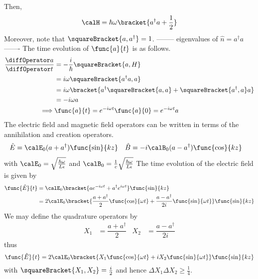 Then, 
\begin{equation*}
    \calH = \hbar \omega \bracket{a^{\dagger} a + \dfrac{1}{2}}
\end{equation*}
Moreover, note that \(\squareBracket{a,a^{\dagger}} = 1\). -------- eigenvalues of \(\hat{n} = a^{\dagger} a\) -------
The time evolution of \(\func{a}{t}\) is as follows.
\begin{align*}
    \dfrac{\diffOperator a}{\diffOperator t} &= -\frac{i}{\hbar} \squareBracket{a,H}\\
    &= i\omega \squareBracket{a^{\dagger}a , a}\\
    &= i\omega \bracket{a^{\dagger} \squareBracket{a,a} + \squareBracket{a^{\dagger},a}a}\\
    &= -i\omega a \\
    \implies& \func{a}{t} = e^{-i\omega t} \func{a}{0} = e^{-i\omega t} a
\end{align*}
The electric field and magnetic field operators can be written in terms of the annihilation and creation operators.  
\begin{align*}
    \hat{E} &= \calE_0 (a + a^{\dagger}) \func{\sin}{kz} &
    \hat{B} &= -i\calB_0 (a - a^{\dagger}) \func{\cos}{kz}
\end{align*}
with \(\calE_0 = \sqrt{\frac{\hbar\omega}{L \epsilon}}\) and \(\calB_0 = \frac{1}{c} \sqrt{\frac{\hbar \omega}{L \epsilon}} \)
The time evolution of the electric field is given by 
\begin{align*}
    \func{\hat{E}}{t} &= \calE_0 \bracket{a e^{-i\omega t} + a^{\dagger} e^{i\omega t}}\func{\sin}{kz}\\
    &= 2\calE_0 \bracket{\dfrac{a + a^{\dagger}}{2} \func{\cos}{\omega t}  + \dfrac{a - a^{\dagger}}{2i} \func{\sin}{\omega t}}\func{\sin}{kz}
\end{align*}
We may define the quadrature operators by 
\begin{align*}
    X_1 &= \dfrac{a + a^{\dagger}}{2}  & X_2 &= \dfrac{a - a^{\dagger}}{2i} 
\end{align*}
thus 
\begin{equation*}
    \func{\hat{E}}{t}= 2\calE_0 \bracket{X_1 \func{\cos}{\omega t} + iX_2 \func{\sin}{\omega t}}\func{\sin}{kz}\\
\end{equation*}
with \(\squareBracket{X_1,X_2} = \frac{i}{2}\) and hence \(\Delta X_1 \Delta X_2 \geq \frac{1}{4}\).


